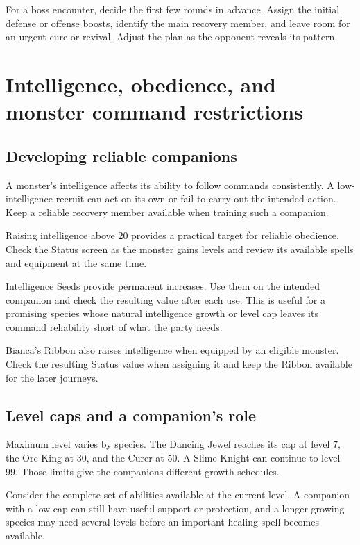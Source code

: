 For a boss encounter, decide the first few rounds in advance. Assign the
initial defense or offense boosts, identify the main recovery member,
and leave room for an urgent cure or revival. Adjust the plan as the
opponent reveals its pattern.

\section{Intelligence, obedience, and monster command restrictions}

\subsection*{Developing reliable companions}

A monster's intelligence affects its ability to follow commands
consistently. A low-intelligence recruit can act on its own or fail to
carry out the intended action. Keep a reliable recovery member available
when training such a companion.

Raising intelligence above 20 provides a practical target for reliable
obedience. Check the Status screen as the monster gains levels and review
its available spells and equipment at the same time.

Intelligence Seeds provide permanent increases. Use them on the intended
companion and check the resulting value after each use. This is useful
for a promising species whose natural intelligence growth or level cap
leaves its command reliability short of what the party needs.

Bianca's Ribbon also raises intelligence when equipped by an eligible
monster. Check the resulting Status value when assigning it and keep
the Ribbon available for the later journeys.

\subsection*{Level caps and a companion's role}

Maximum level varies by species. The Dancing Jewel reaches its cap at
level 7, the Orc King at 30, and the Curer at 50. A Slime Knight can continue
to level 99. Those limits give the companions different growth schedules.

Consider the complete set of abilities available at the current level.
A companion with a low cap can still have useful support or protection,
and a longer-growing species may need several levels before an important
healing spell becomes available.

